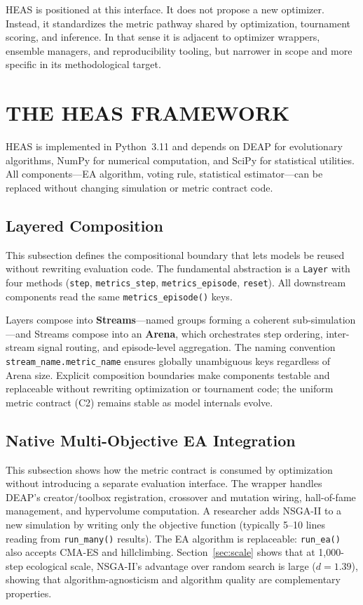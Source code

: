\documentclass{wscpaperproc}
\begin{document}
HEAS is positioned at this interface. It does not propose a new optimizer.
Instead, it standardizes the metric pathway shared by optimization, tournament
scoring, and inference. In that sense it is adjacent to optimizer wrappers,
ensemble managers, and reproducibility tooling, but narrower in scope and more
specific in its methodological target.

\section{THE HEAS FRAMEWORK}

HEAS is implemented in Python~3.11 and depends on DEAP for evolutionary
algorithms, NumPy for numerical computation, and SciPy for statistical
utilities. All components---EA algorithm, voting rule, statistical
estimator---can be replaced without changing simulation or metric contract code.

\subsection{Layered Composition}

This subsection defines the compositional boundary that lets models be reused
without rewriting evaluation code. The fundamental abstraction is a
\texttt{Layer} with four methods
(\texttt{step}, \texttt{metrics\_step}, \texttt{metrics\_episode},
\texttt{reset}). All downstream components read the same
\texttt{metrics\_episode()} keys.

Layers compose into \textbf{Streams}---named groups forming a coherent
sub-simulation---and Streams compose into an \textbf{Arena}, which orchestrates
step ordering, inter-stream signal routing, and episode-level aggregation. The
naming convention \texttt{stream\_name.metric\_name} ensures globally unambiguous
keys regardless of Arena size. Explicit composition boundaries make components
testable and replaceable without rewriting optimization or tournament code;
the uniform metric contract (C2) remains stable as model internals evolve.

\subsection{Native Multi-Objective EA Integration}

This subsection shows how the metric contract is consumed by optimization
without introducing a separate evaluation interface. The wrapper handles DEAP's creator/toolbox registration, crossover and mutation
wiring, hall-of-fame management, and hypervolume computation. A researcher adds
NSGA-II to a new simulation by writing only the objective function (typically
5--10 lines reading from \texttt{run\_many()} results). The EA algorithm is
replaceable: \texttt{run\_ea()} also accepts CMA-ES and hillclimbing.
Section~\ref{sec:scale} shows that at 1,000-step ecological scale, NSGA-II's
advantage over random search is large ($d\!=\!1.39$), showing that
algorithm-agnosticism and algorithm quality are complementary properties.
\end{document}
